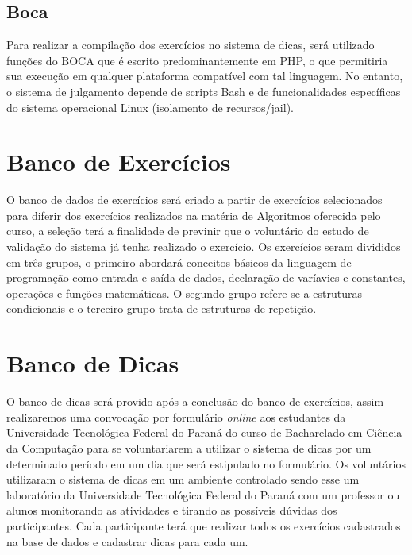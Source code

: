 \subsection{Boca}

Para realizar a compilação dos exercícios no sistema de dicas, será utilizado funções do  BOCA que é escrito predominantemente em PHP, o que permitiria sua execução em qualquer plataforma compatível com tal linguagem. No entanto, o sistema de julgamento depende de scripts Bash e de funcionalidades específicas do sistema operacional Linux (isolamento de recursos/jail). 

\section{Banco de Exercícios}

O banco de dados de exercícios será criado a partir de exercícios selecionados para diferir dos exercícios realizados na matéria de Algoritmos oferecida pelo curso, a seleção terá a finalidade de previnir que o voluntário do estudo de validação do sistema já tenha realizado o exercício. Os exercícios seram divididos em três grupos, o primeiro abordará conceitos básicos da linguagem de programação como entrada e saída de dados, declaração de varíavies e constantes, operações e funções matemáticas. O segundo grupo refere-se a estruturas condicionais e o terceiro grupo trata de estruturas de repetição.

\section{Banco de Dicas}

O banco de dicas será provido após a conclusão do banco de exercícios, assim realizaremos uma convocação por formulário \textit{online} aos estudantes da Universidade Tecnológica Federal do Paraná do curso de Bacharelado em Ciência da Computação para se voluntariarem a utilizar o sistema de dicas por um determinado período em um dia que será estipulado no formulário. Os voluntários utilizaram o sistema de dicas em um ambiente controlado sendo esse um laboratório da Universidade Tecnológica Federal do Paraná com um professor ou alunos monitorando as atividades e tirando as possíveis dúvidas dos participantes. Cada participante terá que realizar todos os exercícios cadastrados na base de dados e cadastrar dicas para cada um.